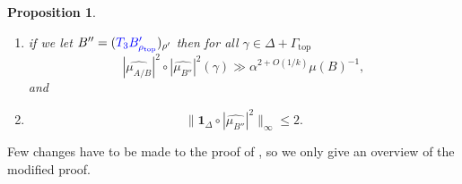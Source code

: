 \documentclass{daj}
\newtheorem{proposition}[theorem]{Proposition}
\theoremstyle{definition}
\newcommand{\mh}[1]{\widehat{\mu_{#1}}}
\newcommand{\ind}[1]{\mathbf{1}_{#1}}
\newcommand{\blue}[1]{\textcolor{blue}{#1}}
\begin{document}
\begin{proposition}
\begin{enumerate}
\begin{enumerate}
		\item if we let $B'' = (\blue{T_3 B_{\rho_{\mathrm{top}}}'})_{\rho'}$ then for all $\gamma \in\Delta + \Gamma_{\mathrm{top}}$
		\begin{equation*}
		|\mh{A/B}|^2 \circ |\mh{B''}|^2 (\gamma) \gg \alpha^{2+O(1/k)} \mu(B)^{-1},
		\end{equation*}
		and
		\item \begin{equation*}
		\Big\|\ind{\Delta} \circ |\mh{B''}|^2\Big\|_{\infty} \leq 2.
		\end{equation*}
	\end{enumerate}
\end{enumerate}
\end{proposition}

Few changes have to be made to the proof of \cite[Proposition~8.1]{BS}, so we only give an overview of the modified proof.
\end{document}
